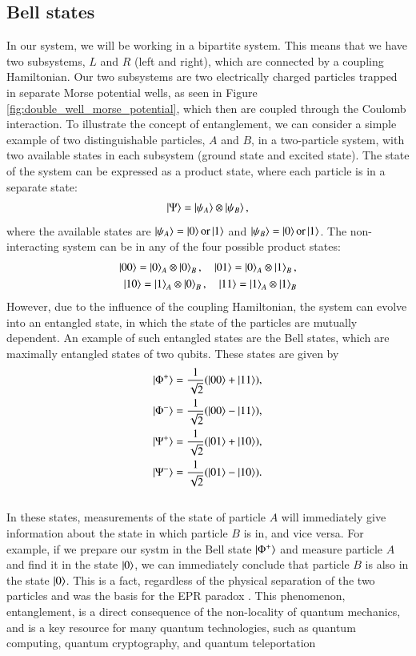 \documentclass{subfiles}
\begin{document}
\subsection{Bell states}
In our system, we will be working in a bipartite system. This means that we have two subsystems, $L$ and $R$ (left and right), which are connected by a coupling Hamiltonian. Our two subsystems are two electrically charged particles trapped in separate Morse potential wells, as seen in Figure \eqref{fig:double_well_morse_potential}, which then are coupled through the Coulomb interaction. 
To illustrate the concept of entanglement, we can consider a simple example of two distinguishable particles, $A$ and $B$, in a two-particle system, with two available states in each subsystem (ground state and excited state). The state of the system can be expressed as a product state, where each particle is in a separate state:
\begin{align*}
    \ket{\Psi} = \ket{\psi_A}\otimes\ket{\psi_B},
\end{align*}
where the available states are $\ket{\psi_A} = \ket{0} \text{or} \ket{1}$ and $\ket{\psi_B} = \ket{0} \text{or} \ket{1}$. The non-interacting system can be in any of the four possible product states: 
\begin{align*}
    \ket{00} = \ket{0}_A\otimes\ket{0}_B, \quad \ket{01} = \ket{0}_A\otimes\ket{1}_B, \\
    \ket{10} = \ket{1}_A\otimes\ket{0}_B, \quad \ket{11} = \ket{1}_A\otimes\ket{1}_B
\end{align*}
However, due to the influence of the coupling Hamiltonian, the system can evolve into an entangled state, in which the state of the particles are mutually dependent. An example of such entangled states are the Bell states, which are maximally entangled states of two qubits. These states are given by
\begin{align}
    \ket{\Phi^+} &= \frac{1}{\sqrt{2}}(\ket{00} + \ket{11}), \\
    \ket{\Phi^-} &= \frac{1}{\sqrt{2}}(\ket{00} - \ket{11}), \\
    \ket{\Psi^+} &= \frac{1}{\sqrt{2}}(\ket{01} + \ket{10}), \\
    \ket{\Psi^-} &= \frac{1}{\sqrt{2}}(\ket{01} - \ket{10})\label{eq:bell_states}.
\end{align}
\\ 
In these states, measurements of the state of particle $A$ will immediately give information about the state in which particle $B$ is in, and vice versa. For example, if we prepare our systm in the Bell state $\ket{\Phi^+}$ and measure particle $A$ and find it in the state $\ket{0}$, we can immediately conclude that particle $B$ is also in the state $\ket{0}$. This is a fact, regardless of the physical separation of the two particles and was the basis for the EPR paradox \cite{EPR_1935}. This phenomenon, entanglement, is a direct consequence of the non-locality of quantum mechanics, and is a key resource for many quantum technologies, such as quantum computing, quantum cryptography, and quantum teleportation \cite{bouwmeester1997experimental, gisin2002quantum, nielsen2010quantum}\\ 
\end{document}
